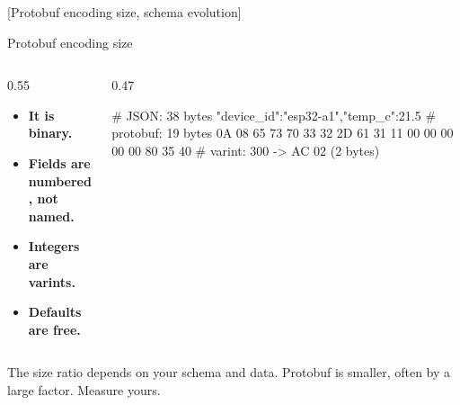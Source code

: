 \documentclass[10pt,aspectratio=169,t]{beamer}
\begin{document}
[Protobuf encoding size, schema evolution]

\begin{frame}[fragile,eyebrow=Wire format]{Protobuf encoding size}
  \begin{columns}[T]
    \begin{column}{0.55\textwidth}
      {
      \begin{itemize}
        \item \textbf{It is binary.} 
        \item \textbf{Fields are numbered, not named.} 
        \item \textbf{Integers are varints.} 
        \item \textbf{Defaults are free.} 
      \end{itemize}}
    \end{column}
    \begin{column}{0.47\textwidth}
\begin{codeblock}[basicstyle=\ttfamily\fontsize{7}{9}\selectfont\color{upbInk}]
# JSON: 38 bytes
{"device_id":"esp32-a1","temp_c":21.5}
# protobuf: 19 bytes
0A 08 65 73 70 33 32 2D 61 31
11 00 00 00 00 00 80 35 40
# varint: 300 -> AC 02 (2 bytes)
\end{codeblock}
    \end{column}
  \end{columns}
  \begin{takeaway}{The size ratio depends on your schema and data.}
    Protobuf is smaller, often by a large factor. Measure yours.
  \end{takeaway}
\end{frame}
\end{document}
